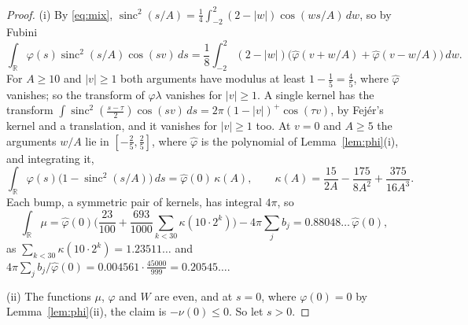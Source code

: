 \documentclass[11pt]{article}
\theoremstyle{definition}
\newcommand{\sinc}{\operatorname{sinc}}
\begin{document}
\begin{proof}
(i) By \eqref{eq:mix}, $\sinc^2(s/A) = \frac14 \int_{-2}^{2} (2 - |w|) \cos(ws/A)\,dw$, so by Fubini
\[
\int_{\mathbb R} \varphi(s) \sinc^2(s/A) \cos(sv)\,ds = \frac18 \int_{-2}^{2} (2 - |w|)\big(\hat\varphi(v + w/A) +
\hat\varphi(v - w/A)\big)\,dw .
\]
For $A \ge 10$ and $|v| \ge 1$ both arguments have modulus at least $1 - \frac15 = \frac45$, where $\hat\varphi$
vanishes; so the transform of $\varphi\lambda$ vanishes for $|v| \ge 1$. A single kernel has the transform $\int
\sinc^2(\frac{s - \tau}{2}) \cos(sv)\,ds = 2\pi(1 - |v|)^+ \cos(\tau v)$, by Fejér's kernel and a translation, and
it vanishes for $|v| \ge 1$ too. At $v = 0$ and $A \ge 5$ the arguments $w/A$ lie in $[-\frac25, \frac25]$, where
$\hat\varphi$ is the polynomial of Lemma~\ref{lem:phi}(i), and integrating it,
\[
\int_{\mathbb R} \varphi(s)\big(1 - \sinc^2(s/A)\big)\,ds =
\hat\varphi(0)\,\kappa(A), \qquad \kappa(A) = \frac{15}{2A} -
\frac{175}{8A^2} + \frac{375}{16A^3} .
\]
Each bump, a symmetric pair of kernels, has integral $4\pi$, so
\[
\int_{\mathbb R} \mu = \hat\varphi(0)\Big(\frac{23}{100} +
\frac{693}{1000} \sum_{k < 30} \kappa(10 \cdot 2^k)\Big) - 4\pi
\sum_j b_j = 0.88048\ldots\,\hat\varphi(0),
\]
as $\sum_{k < 30} \kappa(10 \cdot 2^k) = 1.23511\ldots$ and $4\pi \sum_j b_j/\hat\varphi(0) = 0.004561 \cdot
\frac{45000}{999} = 0.20545\ldots$.

(ii) The functions $\mu$, $\varphi$ and $W$ are even, and at $s = 0$, where $\varphi(0) = 0$ by
Lemma~\ref{lem:phi}(ii), the claim is $-\nu(0) \le 0$. So let $s > 0$.


\end{proof}
\end{document}
